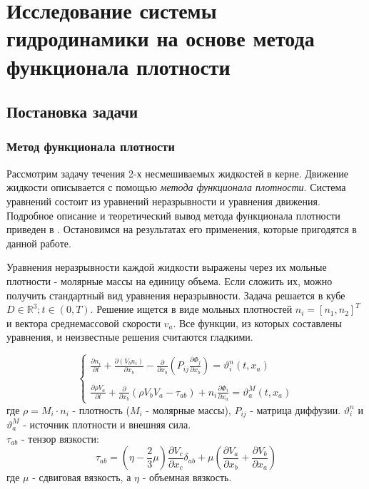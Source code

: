 \section{Исследование системы гидродинамики на основе метода функционала плотности \label{dhd}}
\subsection{Постановка задачи}
\subsubsection{Метод функционала плотности}
Рассмотрим задачу течения 2-х несмешиваемых жидкостей в керне. Движение жидкости описывается с помощью \textit{метода функционала плотности}. Система уравнений состоит из уравнений неразрывности и уравнения движения.
Подробное описание и теоретический вывод метода функционала плотности приведен в \cite{demyanov, dhd_spe}. Остановимся на результатах его применения, которые пригодятся в данной работе.
\par
Уравнения неразрывности каждой жидкости выражены через их мольные плотности - молярные массы на единицу объема. Если сложить их, можно получить стандартный вид уравнения неразрывности. 
Задача решается в кубе $D \in \mathbb{R}^3; t \in (0, T)$. Решение ищется в виде мольных плотностей $n_i = [n_1, n_2]^T$ и вектора среднемассовой скорости $v_a$. Все функции, из которых составлены уравнения, и неизвестные решения считаются гладкими.

\begin{equation} \label{eq:dhd_system}
\begin{cases}
\frac{\partial n_{i}}{\partial t}+\frac{\partial\left(V_{b}n_{i}\right)}{\partial x_{b}}-\frac{\partial}{\partial x_{b}}\left(P_{i j}\frac{\partial\Phi_{j}}{\partial x_{b}}\right)=\vartheta_{i}^{n}(t,x_{a}) 
\\ \\
\frac {\partial\rho V_{a}} {\partial t} + \frac {\partial} {\partial x_{b}} \left( \rho V_{b}V_{a} - \tau_{ab} \right) + n_i \frac{\partial \Phi_i}{\partial x_a}=\vartheta_{a}^{M}(t,x_{a})
\end{cases}
\end{equation}
где $\rho = M_i \cdot n_i$ - плотность ($M_i$ - молярные массы), $P_{ij}$ - матрица диффузии. $\vartheta^n_i$ и $\vartheta^M_a$ - источник плотности и внешняя сила. 
\\
$\tau_{ab}$ - тензор вязкости:
\begin{equation} \label{eq:viscosity_tensor}
\tau_{ab} = (\eta - \frac{2}{3} \mu) \frac {\partial V_c} {\partial x_c} \delta_{ab} + \mu \left( \frac{\partial V_{a}}{\partial x_{b}}+\frac{\partial V_{b}}{\partial x_{a}} \right) 
\end{equation}
где $\mu$ - сдвиговая вязкость, а $\eta$ - объемная вязкость.

